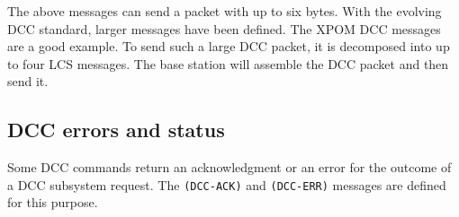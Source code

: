 \begin{table}[ht!]
    \centering 
    \caption{RRaw DCC Packet Management}
\end{table}

The above messages can send a packet with up to six bytes. With the evolving DCC standard, larger messages have been defined. The XPOM DCC messages are a good example. To send such a large DCC packet, it is decomposed into up to four LCS messages. The base station will assemble the DCC packet and then send it. 

\begin{table}[ht!]
    \centering 
    \caption{Raw DCC Packet Management}
\end{table}

\subsection{DCC errors and status}

Some DCC commands return an acknowledgment or an error for the outcome of a DCC subsystem request. The \texttt{(DCC-ACK)} and \texttt{(DCC-ERR)} messages are defined for this purpose.

